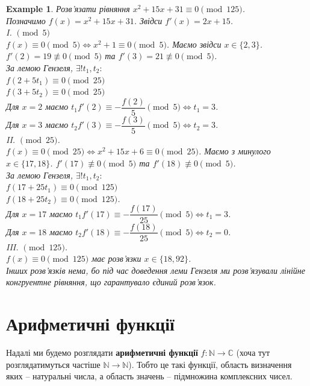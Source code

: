 \documentclass[a4paper, 10pt]{article}
\theoremstyle{theoremdd}
\theoremstyle{theoremdd}
\theoremstyle{theoremdd}
\theoremstyle{theoremdd}
\newtheorem{example}[theorem]{Example}
\theoremstyle{theoremdd}
\theoremstyle{theoremdd}
\theoremstyle{theoremdd}
\theoremstyle{theoremdd}
\begin{document}
\begin{example}
Розв'язати рівняння $x^2+15x+31 \equiv 0 \pmod {125}$.\\
Позначимо $f(x) = x^2+15x+31$. Звідси $f'(x) = 2x+15$.
\medskip \\
I. $\pmod 5$
\medskip \\
$f(x) \equiv 0 \pmod 5 \iff x^2+1 \equiv 0 \pmod 5$. Маємо звідси $x \in \{2,3\}$.\\
$f'(2) = 19 \not\equiv 0 \pmod 5$ та $f'(3) = 21 \not\equiv 0 \pmod 5$.\\
За лемою Гензеля, $\exists! t_1,t_2:$\\
$f(2+5t_1) \equiv 0 \pmod {25}$\\
$f(3+5t_2) \equiv 0 \pmod {25}$\\
Для $x=2$ маємо $t_1f'(2) \equiv -\dfrac{f(2)}{5} \pmod 5 \iff t_1 = 3$.\\
Для $x=3$ маємо $t_2f'(3) \equiv -\dfrac{f(3)}{5} \pmod 5 \iff t_2 = 3$.
\medskip \\
II. $\pmod {25}$.
\medskip \\
$f(x) \equiv 0 \pmod {25} \iff x^2+15x+6 \equiv 0 \pmod {25}$. Маємо з минулого $x \in \{17,18\}$. $f'(17) \not\equiv 0 \pmod 5$ та $f'(18) \not\equiv 0 \pmod 5$.\\
За лемою Гензеля, $\exists !t_1,t_2:$\\
$f(17+25t_1) \equiv 0 \pmod {125}$\\
$f(18+25t_2) \equiv 0 \pmod {125}$.\\
Для $x = 17$ маємо $t_1f'(17) \equiv -\dfrac{f(17)}{25} \pmod 5 \iff t_1 = 3$.\\
Для $x = 18$ маємо $t_2f'(18) \equiv -\dfrac{f(18)}{25} \pmod 5 \iff t_2 = 0$.
\medskip \\
III. $\pmod {125}$.
\medskip \\
$f(x) \equiv 0 \pmod {125}$ має розв'язки $x \in \{18,92\}$. \\
Інших розв'язків нема, бо під час доведення леми Гензеля ми розв'язу\-вали лінійне конгруентне рівняння, що гарантувало єдиний розв'язок.
\end{example}
\newpage

\section{Арифметичні функції}
Надалі ми будемо розглядати \textbf{арифметичні функції} $f \colon \mathbb{N} \to \mathbb{C}$ (хоча тут розглядатимуться частіше $\mathbb{N} \to \mathbb{N}$). Тобто це такі функції, область визначення яких -- натуральні числа, а область значень -- підмножина комплексних чисел.
\end{document}
